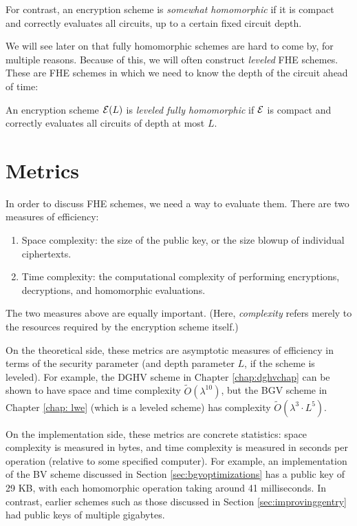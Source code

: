 For contrast, an encryption scheme is \emph{somewhat homomorphic} if it is compact and correctly evaluates all circuits, up to a certain fixed circuit depth.

We will see later on that fully homomorphic schemes are hard to come by, for multiple reasons. Because of this, we will often construct \emph{leveled} FHE schemes. These are FHE schemes in which we need to know the depth of the circuit ahead of time:
\begin{definition}
    An encryption scheme $\mathcal{E}(L)$ is \emph{leveled fully homomorphic} if $\mathcal{E}$ is compact and correctly evaluates all circuits of depth at most $L$.
\end{definition}


\section{Metrics}
    In order to discuss FHE schemes, we need a way to evaluate them. There are two measures of efficiency:
    \begin{enumerate}
        \item Space complexity: the size of the public key, or the size blowup of individual ciphertexts.
        \item Time complexity: the computational complexity of performing encryptions, decryptions, and homomorphic evaluations.
    \end{enumerate}

    The two measures above are equally important. (Here, \emph{complexity} refers merely to the resources required by the encryption scheme itself.)

    On the theoretical side, these metrics are asymptotic measures of efficiency in terms of the security parameter (and depth parameter $L$, if the scheme is leveled). For example, the DGHV scheme in Chapter \ref{chap:dghvchap} can be shown to have space and time complexity $\widetilde{O}(\lambda^{10})$, but the BGV scheme in Chapter \ref{chap: lwe} (which is a leveled scheme) has complexity $\widetilde{O}(\lambda^3 \cdot L^5)$.

    On the implementation side, these metrics are concrete statistics: space complexity is measured in bytes, and time complexity is measured in seconds per operation (relative to some specified computer). For example, an implementation of the BV scheme discussed in Section \ref{sec:bgvoptimizations} has a public key of 29 KB, with each homomorphic operation taking around 41 milliseconds. In contrast, earlier schemes such as those discussed in Section \ref{sec:improvinggentry} had public keys of multiple gigabytes.

